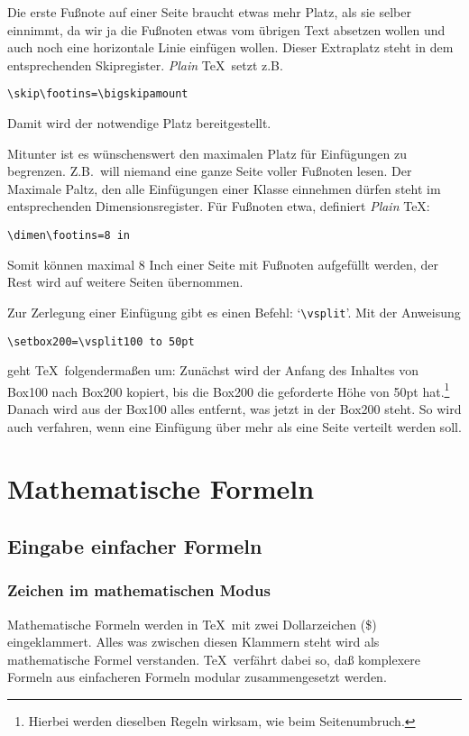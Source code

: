 Die erste Fu\ss{}note auf einer Seite braucht etwas mehr Platz, als sie
selber einnimmt, da wir ja die Fu\ss{}noten etwas vom \"ubrigen Text
absetzen wollen und auch noch eine 
horizontale Linie einf\"ugen wollen.
Dieser Extraplatz steht in dem entsprechenden Skipregister. {\em Plain}
\TeX\ setzt z.B.
\begin{verbatim}
\skip\footins=\bigskipamount
\end{verbatim}
Damit wird der notwendige Platz bereitgestellt.

Mitunter ist es w\"unschenswert den maximalen Platz f\"ur Einf\"ugungen zu
begrenzen. Z.B.\ will niemand eine ganze Seite voller Fu\ss{}noten lesen.
Der Maximale Paltz, den alle Einf\"ugungen einer
Klasse einnehmen d\"urfen
steht im entsprechenden 
Dimensionsregister. F\"ur Fu\ss{}noten etwa,
definiert {\em Plain} \TeX:
\begin{verbatim}
\dimen\footins=8 in
\end{verbatim}
Somit k\"onnen maximal 8 Inch einer Seite mit Fu\ss{}noten aufgef\"ullt
werden, der Rest wird auf weitere Seiten \"ubernommen.

Zur Zerlegung einer Einf\"ugung gibt es einen Befehl:
`\verb|\vsplit|'.
Mit der Anweisung
\begin{verbatim}
\setbox200=\vsplit100 to 50pt
\end{verbatim}
geht \TeX\ folgenderma\ss{}en um: Zun\"achst wird der Anfang des Inhaltes
von 
Box100 nach Box200 kopiert, bis die Box200 die geforderte
H\"ohe von
50pt hat.\footnote{Hierbei werden dieselben Regeln wirksam, wie beim
Seitenumbruch.} Danach wird aus der Box100 alles entfernt, was jetzt
in der Box200 steht. So wird auch verfahren, wenn eine Einf\"ugung \"uber
mehr als eine Seite verteilt werden soll.
\chapter{Mathematische Formeln}
\section{Eingabe einfacher Formeln}
\subsection{Zeichen im mathematischen Modus}
Mathematische Formeln werden in \TeX\ mit zwei 
Dollarzeichen (\$)
eingeklammert. Alles was zwischen diesen Klammern steht wird als
mathematische Formel verstanden. \TeX\ verf\"ahrt dabei so, da\ss{}
komplexere Formeln aus einfacheren Formeln modular zusammengesetzt
werden.

